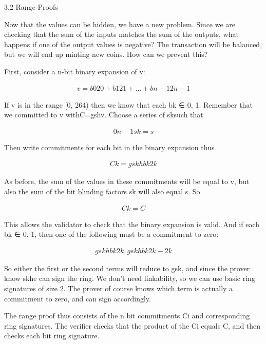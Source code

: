 \documentclass{article}
\begin{document}
3.2 Range Proofs

Now that the values can be hidden, we have a new problem.  Since we are checking that the sum of the inputs matches the sum of the outputs, what happens if one of the output values is negative?  The transaction will be balanced, but we will end up minting new coins.  How can we prevent this?

First, consider a n-bit binary expansion of v:

\begin{eqnarray}
  v=b020+ b121+ … + bn-12n-1
\end{eqnarray}

If v is in the range [0, 264) then we know that each bk ∈ {0, 1}.  Remember that we committed to v withC=gshv.  Choose a series of sksuch that

\begin{eqnarray}
  0n-1sk=s 
\end{eqnarray}

Then write commitments for each bit in the binary expansion thus

\begin{eqnarray}
  Ck=gskhbk2k
\end{eqnarray}

As before, the sum of the values in these commitments will be equal to v, but also the sum of the bit blinding factors sk will also equal s.  So

\begin{eqnarray}
  Ck=C
\end{eqnarray}

This allows the validator to check that the binary expansion is valid.  And if each bk ∈ {0, 1}, then one of the following must be a commitment to zero:

\begin{eqnarray}
  {gskhbk2k,gskhbk2k-2k} 
\end{eqnarray}

So either the first or the second terms will reduce to gsk, and since the prover know skhe can sign the ring.  We don’t need linkability, so we can use basic ring signatures of size 2. The prover of course knows which term is actually a commitment to zero, and can sign accordingly.

The range proof thus consists of the n bit commitments Ci and corresponding ring signatures.  The verifier checks that the product of the Ci equals C, and then checks each bit ring signature.
\end{document}
